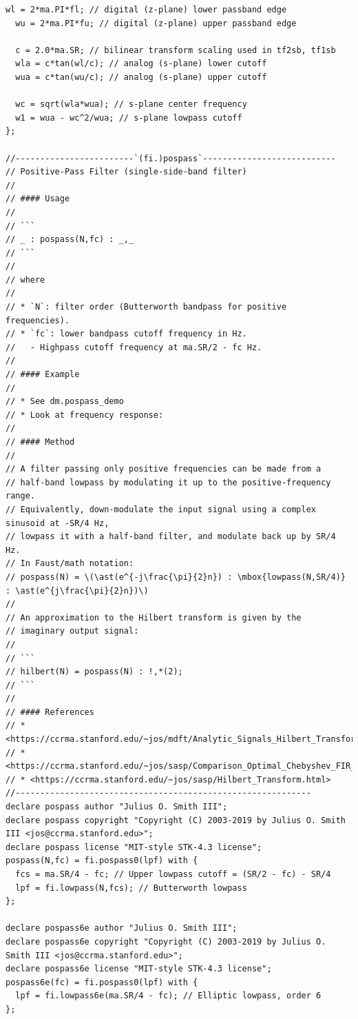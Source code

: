 \documentclass{article}
\begin{document}
\begin{lstlisting}[caption=\texttt{filters.lib}]
  wl = 2*ma.PI*fl; // digital (z-plane) lower passband edge
  wu = 2*ma.PI*fu; // digital (z-plane) upper passband edge

  c = 2.0*ma.SR; // bilinear transform scaling used in tf2sb, tf1sb
  wla = c*tan(wl/c); // analog (s-plane) lower cutoff
  wua = c*tan(wu/c); // analog (s-plane) upper cutoff

  wc = sqrt(wla*wua); // s-plane center frequency
  w1 = wua - wc^2/wua; // s-plane lowpass cutoff
};

//------------------------`(fi.)pospass`---------------------------
// Positive-Pass Filter (single-side-band filter)
//
// #### Usage
//
// ```
// _ : pospass(N,fc) : _,_
// ```
//
// where
//
// * `N`: filter order (Butterworth bandpass for positive frequencies).
// * `fc`: lower bandpass cutoff frequency in Hz.
//   - Highpass cutoff frequency at ma.SR/2 - fc Hz.
//
// #### Example
//
// * See dm.pospass_demo
// * Look at frequency response:
//
// #### Method
//
// A filter passing only positive frequencies can be made from a
// half-band lowpass by modulating it up to the positive-frequency range.
// Equivalently, down-modulate the input signal using a complex sinusoid at -SR/4 Hz,
// lowpass it with a half-band filter, and modulate back up by SR/4 Hz.
// In Faust/math notation:
// pospass(N) = \(\ast(e^{-j\frac{\pi}{2}n}) : \mbox{lowpass(N,SR/4)} : \ast(e^{j\frac{\pi}{2}n})\)
//
// An approximation to the Hilbert transform is given by the
// imaginary output signal:
//
// ```
// hilbert(N) = pospass(N) : !,*(2);
// ```
//
// #### References
// * <https://ccrma.stanford.edu/~jos/mdft/Analytic_Signals_Hilbert_Transform.html>
// * <https://ccrma.stanford.edu/~jos/sasp/Comparison_Optimal_Chebyshev_FIR_I.html>
// * <https://ccrma.stanford.edu/~jos/sasp/Hilbert_Transform.html>
//------------------------------------------------------------
declare pospass author "Julius O. Smith III";
declare pospass copyright "Copyright (C) 2003-2019 by Julius O. Smith III <jos@ccrma.stanford.edu>";
declare pospass license "MIT-style STK-4.3 license";
pospass(N,fc) = fi.pospass0(lpf) with {
  fcs = ma.SR/4 - fc; // Upper lowpass cutoff = (SR/2 - fc) - SR/4
  lpf = fi.lowpass(N,fcs); // Butterworth lowpass
};

declare pospass6e author "Julius O. Smith III";
declare pospass6e copyright "Copyright (C) 2003-2019 by Julius O. Smith III <jos@ccrma.stanford.edu>";
declare pospass6e license "MIT-style STK-4.3 license";
pospass6e(fc) = fi.pospass0(lpf) with {
  lpf = fi.lowpass6e(ma.SR/4 - fc); // Elliptic lowpass, order 6
};


\end{lstlisting}
\end{document}
